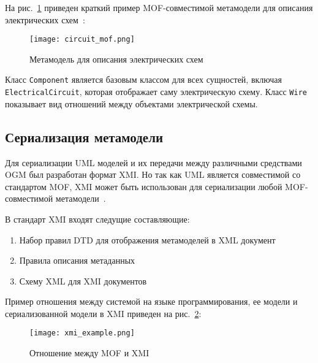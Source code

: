На рис.~\ref{fig:circuit_mof} приведен краткий пример MOF-совместимой метамодели
для описания электрических схем~\cite{essay57286}:

\begin{figure}[ht]
    \begin{center}
        \texttt{[image: circuit\_mof.png]}
    \end{center}
    \caption{Метамодель для описания электрических схем}
    \label{fig:circuit_mof}
\end{figure}

Класс \texttt{Component} является базовым классом для всех сущностей, включая
\texttt{ElectricalCircuit}, которая отображает саму электрическую схему. Класс
\texttt{Wire} показывает вид отношений между объектами электрической схемы.

\subsection{Сериализация метамодели}


Для сериализации UML моделей и их передачи между различными средствами OGM был
разработан формат XMI. Но так как UML является совместимой со стандартом MOF,
XMI может быть использован для сериализации любой MOF-совместимой
метамодели~\cite{standard/XMI}.

В стандарт XMI входят следущие составляющие:

\begin{enumerate}
    \item Набор правил DTD для отображения метамоделей в XML документ
    \item Правила описания метаданных
    \item Схему XML для XMI документов
\end{enumerate}

Пример отношения между системой на языке программирования, ее модели и сериализованной
модели в XMI приведен на рис.~\ref{fig:xmi_example}:

\begin{figure}[ht]
    \begin{center}
        \texttt{[image: xmi\_example.png]}
    \end{center}
    \caption{Отношение между MOF и XMI}
    \label{fig:xmi_example}
\end{figure}

